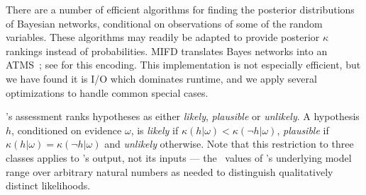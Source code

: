 There are a number of efficient algorithms for finding the posterior distributions of Bayesian networks, 
conditional on observations of some of the random variables. These algorithms may readily be adapted to 
provide posterior $\kappa$ rankings instead of probabilities.
MIFD translates Bayes networks into an
ATMS~\cite{Forbus+DeKleer:1993}; see
\cite{Charniak:88,Poole:93,provan-ijcai89,goldman:09Scyllarus}
%
for this encoding.
This implementation is not especially efficient, but we have found
it is I/O which dominates runtime, and we apply several optimizations to
handle common special cases.
%

\mifd's assessment ranks hypotheses as either
\emph{likely}, \emph{plausible} or \emph{unlikely}. A hypothesis $h$,
conditioned on evidence $\omega$,
is \emph{likely} if
$\kappa(h|\omega) < \kappa(\neg h|\omega)$, \emph{plausible} if $\kappa(h|\omega) = \kappa(\neg h|\omega)$
and \emph{unlikely} otherwise.
%
Note that this restriction to three classes applies to \mifd's output,
not its inputs --- the \tkappa\ values of \mifd's underlying model
range over arbitrary natural numbers as needed to distinguish
qualitatively distinct likelihoods.

